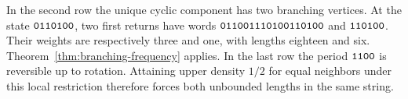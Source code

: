 In the second row the unique cyclic component has two branching vertices. At the state \(\mathtt{0110100}\), two first returns have words \(\mathtt{011001110100110100}\) and \(\mathtt{110100}\). Their weights are respectively three and one, with lengths eighteen and six. Theorem~\ref{thm:branching-frequency} applies. In the last row the period \(\mathtt{1100}\) is reversible up to rotation. Attaining upper density \(1/2\) for equal neighbors under this local restriction therefore forces both unbounded lengths in the same string.
